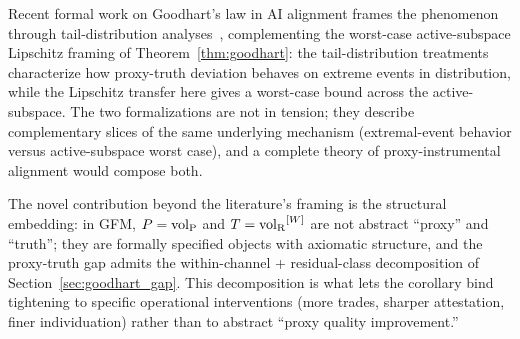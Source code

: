 Recent formal work on Goodhart's law in AI alignment frames the
phenomenon through tail-distribution
analyses~\citep{elmhamdi2024goodhart,majka2025strong},
complementing the worst-case active-subspace Lipschitz framing
of Theorem~\ref{thm:goodhart}: the tail-distribution treatments
characterize how proxy-truth deviation behaves on extreme events
in distribution, while the Lipschitz transfer here gives a
worst-case bound across the active-subspace.  The two
formalizations are not in tension; they describe complementary
slices of the same underlying mechanism (extremal-event behavior
versus active-subspace worst case), and a complete theory of
proxy-instrumental alignment would compose both.

The novel contribution beyond the literature's framing is the
structural embedding: in GFM, $P = {\operatorname{vol}_{\mathrm{P}}}$ and $T = {\operatorname{vol}_{\mathrm{R}}}^{[W]}$
are not abstract ``proxy'' and ``truth''; they are formally
specified objects with axiomatic structure, and the proxy-truth
gap admits the within-channel + residual-class decomposition of
Section~\ref{sec:goodhart_gap}.  This decomposition is what lets
the corollary bind tightening to specific operational
interventions (more trades, sharper attestation, finer
individuation) rather than to abstract ``proxy quality
improvement.''
